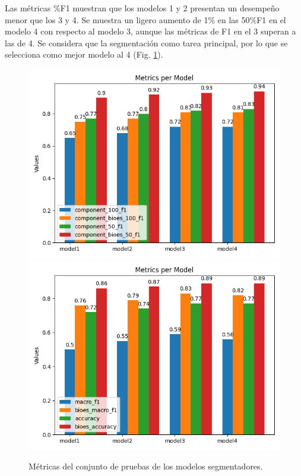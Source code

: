 Las métricas \%F1 muestran que los modelos 1 y 2 presentan un desempeño menor que los 3 y 4. 
Se muestra un ligero aumento de 1\% en las 50\%F1 en el modelo 4 con respecto 
al modelo 3, aunque las métricas de F1 en el 3 superan a las de 4. Se considera que la 
segmentación como tarea principal, por lo que se selecciona como mejor modelo al 4 (Fig. \ref{fig:test_segmenter_model_metrics}).

\begin{figure}[h!]
	\begin{center}
		\includegraphics[scale=.4]{Graphics/persuasive_essays_all_linked_components.png}
		\includegraphics[scale=.4]{Graphics/persuasive_essays_all_linked_macro_micro_metrics.png}
	    \caption{Métricas del conjunto de pruebas de los modelos segmentadores.}\label{fig:test_segmenter_model_metrics}
	\end{center}
\end{figure}


